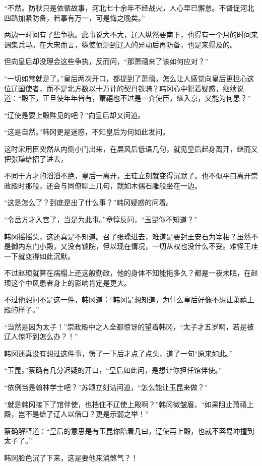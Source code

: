 “不然。防秋只是依循故事，河北七十余年不经战火，人心早已懈怠。不督促河北四路加紧防备，若事有万一，可是悔之晚矣。”

两边一时间有了些争执。此事说大不大，辽人纵然要南下，也得有一个月的时间来调集兵马。在大宋而言，纵使侦测到辽人的异动后再防备，也是来得及的。

但向皇后却没理会这些争执，反而问，“那萧禧来了该如何应对？”

“一切如常就是了。”皇后两次开口，都提到了萧禧。怎么让人感觉向皇后更担心这位辽国使者，而不是北方数以十万计的契丹铁骑？韩冈心中犯着疑惑，继续说道：“殿下，正旦使年年皆有，萧禧也不过是一介使臣，纵入京，又能为何患？”

“辽使是要上殿陛见的吧？”向皇后却又问道。

“这是自然。”韩冈更是迷惑，不知皇后为何如此发问。

这时宋用臣突然从内侧小门出来，在屏风后低语几句，就见皇后起身离开，继而又把张璪给招了进去，

不同于方才的滔滔不绝，皇后一离开，王珪立刻就变得沉默了。也不似平曰离开崇政殿时那般，还会与同僚聊上几句，就如木偶石雕般坐在一边。

“这是怎么了？到底是出了什么事？”韩冈疑惑的问着。

“令岳方才入宫了，当是为此事。”章惇反问，“玉昆你不知道？”

韩冈摇摇头，这还真是不知道。召了张璪进去，难道是要封王安石为宰相？虽然不是御内东门小殿，又没有锁院，但以现在情况，一切从权也没什么不妥。难怪王珪一下就变得如此沉默。

不过赵顼就算在病榻上还这般勤政，他的身体不知能拖多久？都是一夜未眠，在赵顼这个中风患者身上的影响肯定是更大。

不过他想问不是这一件，韩冈道：“韩冈是想知道，为什么皇后好像不想让萧禧上殿的样子。”

“当然是因为太子！”崇政殿中之人全都惊讶的望着韩冈，“太子才五岁啊，若是被辽人惊吓到怎么办？！”

韩冈还真没有想过这件事，愣了一下后才点了点头，道了一句“原来如此。”

“玉昆。”蔡确有几分迟疑的开口，“皇后如此问，是想让你担任馆伴使。”

“依例当是翰林学士吧？”苏颂立刻诘问道，“怎么能让玉昆来做？”

“就是韩冈接下了馆伴使，也挡住不辽使上殿啊？”韩冈微皱眉，“如果阻止萧禧上殿，岂不是给了辽人以借口？更是示弱之举！”

蔡确解释道：“皇后的意思是有玉昆你陪着几曰，辽使再上殿，也就不容易冲撞到太子了。”

韩冈脸色沉了下来，这是要他来消煞气？！


